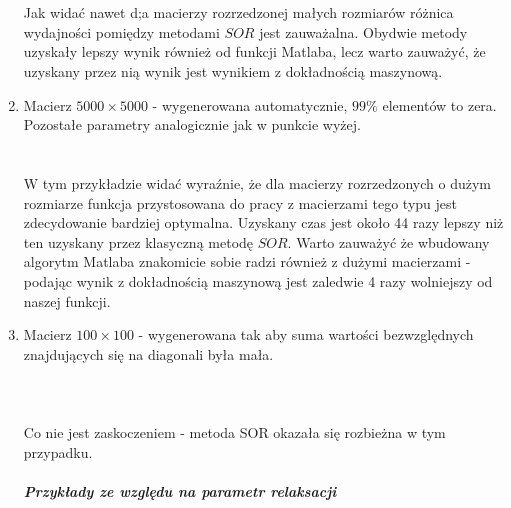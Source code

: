 \documentclass{article}
\begin{document}
\begin{enumerate}
\noindent{}\\\\
Jak widać nawet d;a macierzy rozrzedzonej małych rozmiarów różnica wydajności pomiędzy metodami $SOR$ jest zauważalna. Obydwie metody uzyskały lepszy wynik również od funkcji Matlaba, lecz warto zauważyć, że uzyskany przez nią wynik jest wynikiem z dokładnością maszynową.
\item Macierz $5000 \times 5000$ - wygenerowana automatycznie, $99\%$ elementów to zera. Pozostałe parametry analogicznie jak w punkcie wyżej.\\
\noindent{}\\\\
W tym przykładzie widać wyraźnie, że dla macierzy rozrzedzonych o dużym rozmiarze funkcja przystosowana do pracy z macierzami tego typu jest zdecydowanie bardziej optymalna. Uzyskany czas jest około 44 razy lepszy niż ten uzyskany przez klasyczną metodę $SOR$. Warto zauważyć że wbudowany algorytm Matlaba znakomicie sobie radzi również z dużymi macierzami - podając wynik z dokładnością maszynową jest zaledwie 4 razy wolniejszy od naszej funkcji.
\item Macierz $100\times 100$ - wygenerowana tak aby suma wartości bezwzględnych znajdujących się na diagonali była mała.\\\\
\noindent{}\\\\
Co nie jest zaskoczeniem - metoda SOR okazała się rozbieżna w tym przypadku.
\subparagraph{Przykłady ze względu na parametr relaksacji}
\end{enumerate}
\end{document}
